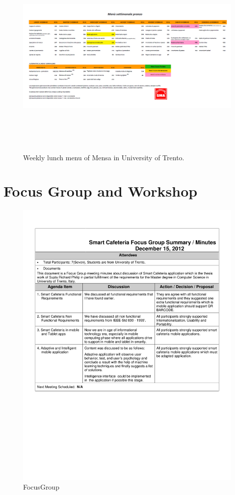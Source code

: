 \begin{appendices}
\begin{figure}[h!t]
    \centering
      \includegraphics[width=5.5in,height=4in]{ch3/AppendixMenu/Weeklylunchmenu}
  \caption{Weekly lunch menu of Mensa in University of Trento.}
  \label{Weeklylunchmenu}
\end{figure}
\newpage
\section{Focus Group and Workshop}
\label{sec:AppendixFocusGroup}
\begin{figure}[h!t]
    \centering
      \includegraphics[width=5.5in]{ch3/AppendixFocusGroup/FocusGroup}
  \caption{FocusGroup}
  \label{FocusGroup}
\end{figure}
\newpage


\end{appendices}
